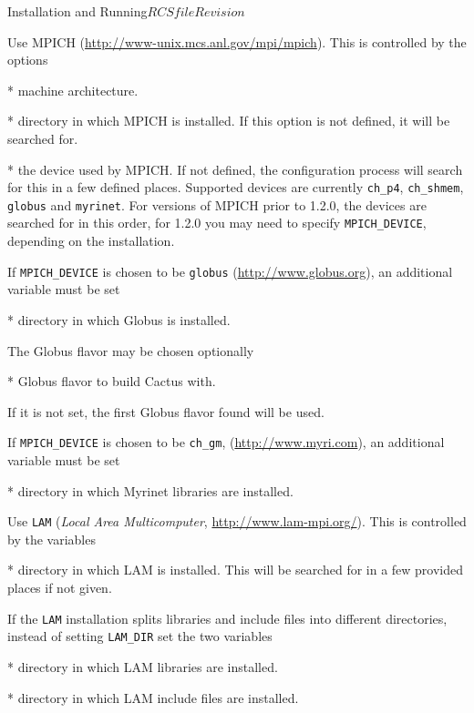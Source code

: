 \begin{cactuspart}{Installation and Running}{$RCSfile$}{$Revision$}
\begin{Lentry}
\item[\texttt{MPICH}]
Use MPICH (\url{http://www-unix.mcs.anl.gov/mpi/mpich}). This is controlled
by the options
  \begin{Lentry}
  \item [\texttt{MPICH\_ARCH}] * machine architecture.
  \item [\texttt{MPICH\_DIR} ] * directory in which MPICH is installed.
        If this option is not defined, it will be searched for.
  \item [\texttt{MPICH\_DEVICE}] * the device used by MPICH. If not
        defined, the configuration process will search for this in a
        few defined places.
        Supported devices are currently \texttt{ch\_p4}, \texttt{ch\_shmem},
        \texttt{globus} and \texttt{myrinet}.
        For versions of MPICH prior to 1.2.0, the devices are searched for
         in this order, for 1.2.0 you may need to specify \texttt{MPICH\_DEVICE},
        depending on the installation.
  \end{Lentry}

If \texttt{MPICH\_DEVICE} is chosen to be \texttt{globus}
(\url{http://www.globus.org}), an additional variable must be set
  \begin{Lentry}
  \item[\texttt{GLOBUS\_LOCATION}] * directory in which Globus is installed.
  \end{Lentry}
The Globus flavor may be chosen optionally
  \begin{Lentry}
  \item[\texttt{GLOBUS\_FLAVOR}] * Globus flavor to build Cactus with.
  \end{Lentry}
If it is not set, the first Globus flavor found will be used.

If \texttt{MPICH\_DEVICE} is chosen to be \texttt{ch\_gm},
(\url{http://www.myri.com}), an additional variable must be set
  \begin{Lentry}
  \item[\texttt{MYRINET\_DIR}] * directory in which Myrinet libraries are installed.
  \end{Lentry}

\item[\texttt{LAM}]
Use \texttt{LAM} (\textit{Local Area Multicomputer}, \url{http://www.lam-mpi.org/}).
This is controlled by the variables
  \begin{Lentry}
  \item[\texttt{LAM\_DIR} ] * directory in which LAM is installed. This
     will be searched for in a few provided places if not given.
  \end{Lentry}
If the \texttt{LAM} installation splits libraries and include files into different
directories, instead of setting \texttt{LAM\_DIR} set the two variables
  \begin{Lentry}
  \item[\texttt{LAM\_LIB\_DIR}] * directory in which LAM libraries are installed.
  \item[\texttt{LAM\_INC\_DIR}] * directory in which LAM include files are installed.
  \end{Lentry}



\end{Lentry}
\end{cactuspart}
